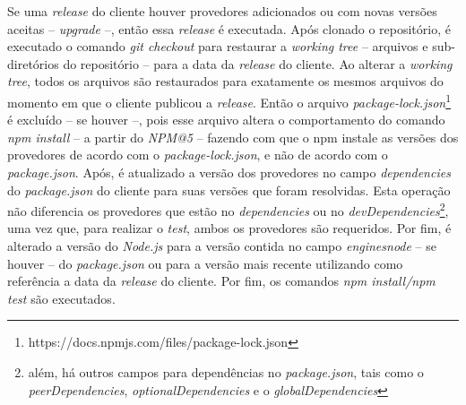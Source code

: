 Se uma \textit{release} do cliente houver provedores adicionados ou com novas versões aceitas -- \textit{upgrade} --, então essa \textit{release} é executada. Após clonado o repositório, é executado o comando \textit{git checkout} para restaurar a \textit{working tree} -- arquivos e sub-diretórios do repositório -- para a data da \textit{release} do cliente. Ao alterar a \textit{working tree}, todos os arquivos são restaurados para exatamente os mesmos arquivos do momento em que o cliente publicou a \textit{release}. Então o arquivo \textit{package-lock.json}\footnote{https://docs.npmjs.com/files/package-lock.json} é excluído -- se houver --, pois esse arquivo altera o comportamento do comando \textit{npm install} -- a partir do \textit{NPM@5} -- fazendo com que o \gls{npm} instale as versões dos provedores de acordo com o \textit{package-lock.json}, e não de acordo com o \textit{package.json}. Após, é atualizado a versão dos provedores no campo \textit{dependencies} do \textit{package.json} do cliente para suas versões que foram resolvidas. Esta operação não diferencia os provedores que estão no \textit{dependencies} ou no \textit{devDependencies}\footnote{além, há outros campos para dependências no \textit{package.json}, tais como o \textit{peerDependencies}, \textit{optionalDependencies} e o \textit{globalDependencies}}, uma vez que, para realizar o \textit{test}, ambos os provedores são requeridos. Por fim, é alterado a versão do \textit{Node.js} para a versão contida no campo \textit{engines\textrightarrow node} -- se houver -- do \textit{package.json} ou para a versão mais recente utilizando como referência a data da \textit{release} do cliente. Por fim, os comandos \textit{npm install/npm test} são executados.

